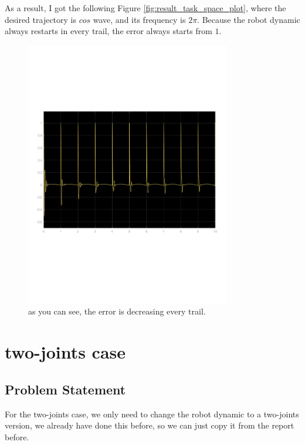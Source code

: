 \documentclass{article}
\begin{document}
As a result, I got the following Figure \ref{fig:result_task_space_plot}, where the desired trajectory is $cos$ wave, and its frequency is $2 \pi$. Because the robot dynamic always restarts in every trail, the error always starts from $1$.
\\
\begin{figure}[ht]
    \centering
    \includegraphics[width=0.8\textwidth]{report/figures/result_ilc.pdf}
    \caption{as you can see, the error is decreasing every trail.}
    \label{fig:result_ilc}
\end{figure}





\newpage

\section{\centering \Large two-joints case} 

\subsection*{Problem Statement}

For the two-joints case, we only need to change the robot dynamic to a two-joints version, we already have done this before, so we can just copy it from the report before.
\end{document}
